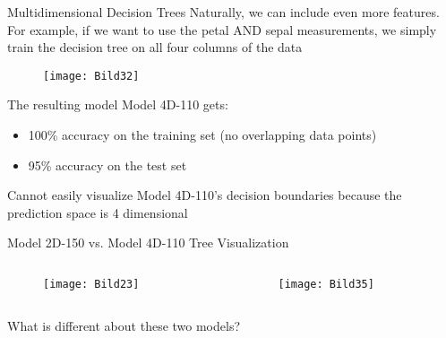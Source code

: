 \documentclass[aspectratio=169]{../latex_main/tntbeamer}  %
\begin{document}
	
	\begin{frame}{Multidimensional Decision Trees}
	  Naturally, we can include even more features. For example, if we want to use the petal AND sepal measurements, we simply train the decision tree on all four columns of the data\\
	  \begin{figure}
	        \centering
	        \texttt{[image: Bild32]}
	    \end{figure}
	    The resulting model Model 4D-110 gets:
	    \begin{itemize}
	        \item 100\% accuracy on the training set (no overlapping data points)
            \item 95\% accuracy on the test set
	    \end{itemize}
	    Cannot easily visualize Model 4D-110’s decision   boundaries because the prediction space   is 4 dimensional
	\end{frame}
	
	
	\begin{frame}{Model 2D-150 vs. Model 4D-110 Tree Visualization}
	    \begin{columns}
	        \begin{column}{.5\textwidth}
	                \begin{figure}
	                    \texttt{[image: Bild23]}
	                \end{figure}
	        \end{column}
	   
	        \begin{column}{.5\textwidth}
	                \begin{figure}
	                    \texttt{[image: Bild35]}
	                \end{figure}
	        \end{column}
	    \end{columns}
	    What is different about these two models?
	\end{frame}
	
\end{document}
